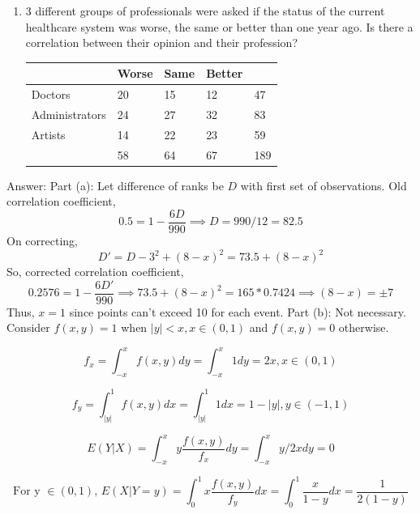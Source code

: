 \documentclass[12pt, oneside]{article}
\begin{document}
\begin{enumerate}
\begin{enumerate}
    \item 3 different groups of professionals were asked if the status of the current healthcare system was worse, the same or better than one year ago. Is there a correlation between their opinion and their profession?
    \begin{table}[!htb]
    \centering
\begin{tabular}{|l|lll|l|}
\hline
               & \multicolumn{1}{l|}{Worse} & \multicolumn{1}{l|}{Same} & Better &     \\ \hline
Doctors        & 20                         & 15                        & 12     & 47  \\ \cline{1-1} \cline{5-5} 
Administrators & 24                         & 27                        & 32     & 83  \\ \cline{1-1} \cline{5-5} 
Artists        & 14                         & 22                        & 23     & 59  \\ \hline
               & \multicolumn{1}{l|}{58}    & \multicolumn{1}{l|}{64}   & 67     & 189 \\ \hline
\end{tabular}
\end{table}
\end{enumerate}


Answer:
\newline Part (a): Let difference of ranks be $D$ with first set of observations.
\newline Old correlation coefficient,
$$
0.5 = 1 - \dfrac{6D}{990} \implies D = 990/12 = 82.5
$$
On correcting,
$$
D' = D - 3^2 + (8-x)^2 = 73.5 + (8-x)^2
$$
So, corrected correlation coefficient,
$$
0.2576 = 1 - \dfrac{6D'}{990} \implies 73.5 + (8-x)^2 = 165*0.7424 \implies 
(8-x) = \pm 7$$
Thus, $x = 1$ since points can't exceed 10 for each event.
\newline Part (b): Not necessary. Consider 
$f(x,y) = 1$ when $|y| < x, x \in (0,1)$ and
$f(x,y) = 0$ otherwise. 

$$
f_x = \int_{-x}^{x} f(x,y) dy = \int_{-x}^{x} 1 dy = 2x, x \in (0,1)
$$

$$
f_y = \int_{|y|}^{1} f(x,y) dx = \int_{|y|}^{1} 1 dx = 1 - |y|, y \in (-1,1)
$$

$$
E(Y|X) = \int_{-x}^{x} y \dfrac{f(x,y)}{f_x} dy = \int_{-x}^{x} y/2x dy = 0
$$

$$
\text{For y $\in (0,1)$, } 
E(X|Y=y) = \int_{0}^{1} x \dfrac{f(x,y)}{f_y} dx = \int_{0}^{1} \dfrac{x}{1-y} dx = \dfrac{1}{2(1-y)} 
$$


\end{enumerate}
\end{document}
